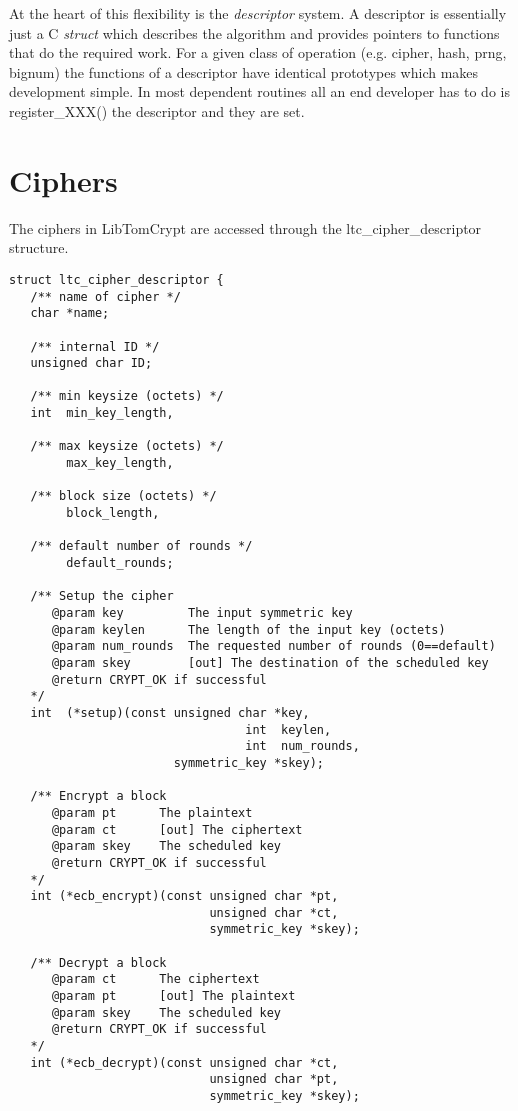 \documentclass[synpaper]{book}
\newcommand{\mysection}[1]    %
	{                   %
	\section{#1}
   \markboth{\textsf{www.libtom.org}}{\thesection ~ {#1}}
	}
\begin{document}
At the heart of this flexibility is the \textit{descriptor} system.  A descriptor is essentially just a C \textit{struct} which describes the algorithm and provides pointers
to functions that do the required work.  For a given class of operation (e.g. cipher, hash, prng, bignum) the functions of a descriptor have identical prototypes which makes 
development simple.  In most dependent routines all an end developer has to do is register\_XXX() the descriptor and they are set.

\mysection{Ciphers}
The ciphers in LibTomCrypt are accessed through the ltc\_cipher\_descriptor structure.

\label{sec:cipherdesc}
\begin{small}
\begin{verbatim}
struct ltc_cipher_descriptor {
   /** name of cipher */
   char *name;

   /** internal ID */
   unsigned char ID;

   /** min keysize (octets) */
   int  min_key_length, 

   /** max keysize (octets) */
        max_key_length, 

   /** block size (octets) */
        block_length, 

   /** default number of rounds */
        default_rounds;

   /** Setup the cipher 
      @param key         The input symmetric key
      @param keylen      The length of the input key (octets)
      @param num_rounds  The requested number of rounds (0==default)
      @param skey        [out] The destination of the scheduled key
      @return CRYPT_OK if successful
   */
   int  (*setup)(const unsigned char *key, 
                                 int  keylen, 
                                 int  num_rounds, 
                       symmetric_key *skey);

   /** Encrypt a block
      @param pt      The plaintext
      @param ct      [out] The ciphertext
      @param skey    The scheduled key
      @return CRYPT_OK if successful
   */
   int (*ecb_encrypt)(const unsigned char *pt, 
                            unsigned char *ct, 
                            symmetric_key *skey);

   /** Decrypt a block
      @param ct      The ciphertext
      @param pt      [out] The plaintext
      @param skey    The scheduled key
      @return CRYPT_OK if successful
   */
   int (*ecb_decrypt)(const unsigned char *ct, 
                            unsigned char *pt, 
                            symmetric_key *skey);


\end{verbatim}
\end{small}
\end{document}
